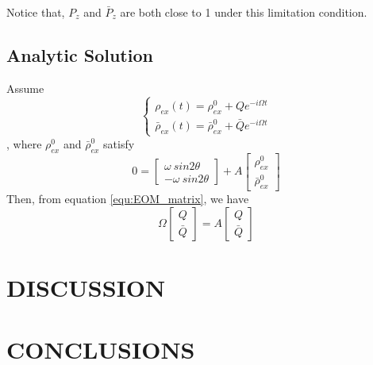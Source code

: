 \documentclass[aps,prd,twocolumn,amsmath,amssymb,groupedaddress]{revtex4-2}
\begin{document}
Notice that, $P_{z}$ and $\bar{P}_{z}$ are both close to 1 under this limitation condition.

\subsection{\label{subsec:analytic} Analytic Solution}
Assume
\begin{equation}
	\begin{cases}
		\rho_{ex}(t) = \rho^0_{ex} + Q e^{-i\Omega t}
		\\
		\bar{\rho}_{ex}(t) = \bar{\rho}^0_{ex} + \bar{Q} e^{-i\Omega t}
	\end{cases}
\end{equation}
, where $\rho^0_{ex}$ and $\bar{\rho}^0_{ex}$ satisfy
\begin{equation}
	0= \begin{bmatrix}
		\omega ~sin2\theta \\ - \omega ~sin2\theta
	\end{bmatrix}  + 
	A \begin{bmatrix} \rho^0_{ex} \\ \bar{\rho}^0_{ex}
	\end{bmatrix}
\end{equation}
Then, from equation \ref{equ:EOM_matrix}, we have
\begin{equation}
	\Omega 
	\begin{bmatrix}
		Q \\ \bar{Q}
	\end{bmatrix}
	= A
	\begin{bmatrix}
		Q \\ \bar{Q}
	\end{bmatrix}
\end{equation}


\section{\label{sec:disscussion} DISCUSSION}

\section{\label{sec:conclusion} CONCLUSIONS}

\end{document}
